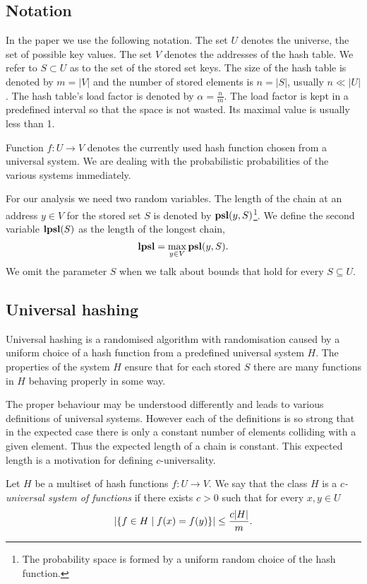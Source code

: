 \documentclass[runningheads,a4paper]{llncs}
\begin{document}
\subsection{Notation}
In the paper we use the following notation. The set $U$ denotes the universe, the set of possible key values. The set $V$ denotes the addresses of the hash table. We refer to $S \subset U$ as to the set of the stored set keys. The size of the hash table is denoted by $m = |V|$ and the number of stored elements is $n = |S|$, usually $n \ll |U|$. The hash table's load factor is denoted by $\alpha = \frac{n}{m}$. The load factor is kept in a predefined interval so that the space is not wasted. Its maximal value is usually less than 1.

Function $f\colon U \rightarrow V$ denotes the currently used hash function chosen from a universal system. We are dealing with the probabilistic probabilities of the various systems immediately.

For our analysis we need two random variables. The length of the chain at an address $y \in V$ for the stored set $S$ is denoted by $\mathbf{psl}(y, S)$\footnote{The probability space is formed by a uniform random choice of the hash function.}. We define the second variable $\mathbf{lpsl}(S)$ as the length of the longest chain, $$\mathbf{lpsl} = \max_{y \in V} \mathbf{psl}(y, S).$$ We omit the parameter $S$ when we talk about bounds that hold for every $S \subseteq U$.

\subsection{Universal hashing}
Universal hashing is a randomised algorithm with randomisation caused by a uniform choice of a hash function from a predefined universal system $H$. The properties of the system $H$ ensure that for each stored $S$ there are many functions in $H$ behaving properly in some way.

The proper behaviour may be understood differently and leads to various definitions of universal systems. However each of the definitions is so strong that in the expected case there is only a constant number of elements colliding with a given element. Thus the expected length of a chain is constant. This expected length is a motivation for defining $c$-universality.

\begin{definition}
\label{definition-c-universal-system}
Let $H$ be a multiset of hash functions $f\colon U \rightarrow V$. We say that the class $H$ is a \emph{$c$-universal system of functions} if there exists $c > 0$ such that for every $x, y \in U$
\[
\left|\lbrace f \in H \mid f(x) = f(y) \rbrace\right| \leq \frac{c|H|}{m}.
\]
\end{definition}
\end{document}
